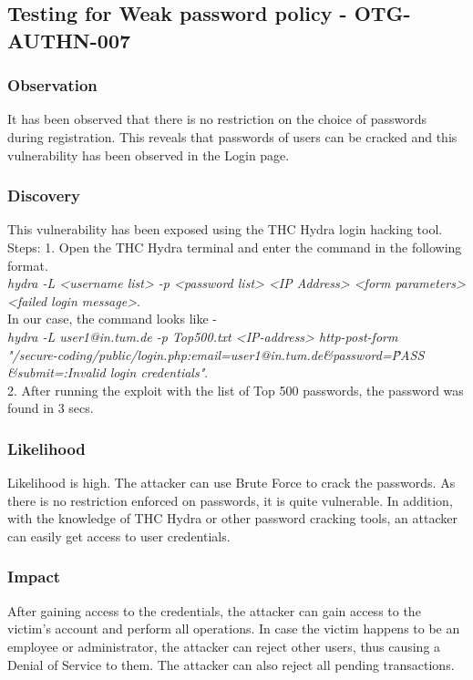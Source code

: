 \subsection{Testing for Weak password policy - OTG-AUTHN-007}

\subsubsection{Observation}
It has been observed that there is no restriction on the choice of passwords during registration. This reveals that passwords of users can be cracked and this vulnerability has been observed in the Login page.

\subsubsection{Discovery}
This vulnerability has been exposed using the THC Hydra login hacking tool. \\
Steps: 
1. Open the THC Hydra terminal and enter the command in the following format. \\
\textit{hydra -L <username list> -p <password list> <IP Address> <form parameters><failed login message>}. \\
In our case, the command looks like - \\
\textit{hydra -L user1@in.tum.de -p Top500.txt <IP-address> http-post-form \\ "/secure-coding/public/login.php:email=user1@in.tum.de\&password=\^PASS\^ \\ \&submit=:Invalid login credentials"}. \\
2. After running the exploit with the list of Top 500 passwords, the password was found in 3 secs.

\subsubsection{Likelihood}
Likelihood is high.
The attacker can use Brute Force to crack the passwords. As there is no restriction enforced on passwords, it is quite vulnerable. In addition, with the knowledge of THC Hydra or other password cracking tools, an attacker can easily get access to user credentials. 

\subsubsection{Impact}
After gaining access to the credentials, the attacker can gain access to the victim's account and perform all operations. In case the victim happens to be an employee or administrator, the attacker can reject other users, thus causing a Denial of Service to them. The attacker can also reject all pending transactions. 

